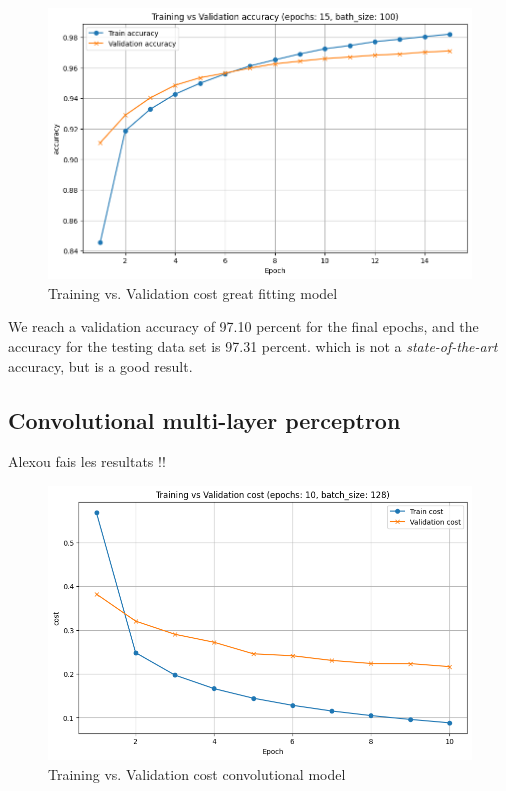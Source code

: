 \documentclass[a4paper, twocolumn, twoside]{article}
\begin{document}
	\begin{figure}[H]
		\begin{center}
			\includegraphics[width=\columnwidth]{images/accuracy_greatfit.png}
		\end{center}
		\caption{Training vs. Validation cost great fitting model}\label{fig:accuracy_greatfit}
	\end{figure}
	We reach a validation accuracy of 97.10 percent for the final epochs, and the accuracy for the testing data set is 97.31 percent.
	which is not a \textit{state-of-the-art} accuracy, but is a good result.
	\subsection{Convolutional multi-layer perceptron}
        Alexou fais les resultats !!

	\begin{figure}[H]
		\begin{center}
			\includegraphics[width=\columnwidth]{images/cost_conv.png}
		\end{center}
		\caption{Training vs. Validation cost convolutional model}\label{fig:cost_conv}
	\end{figure}
\end{document}

